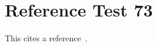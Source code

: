 \documentclass{article}
\begin{document}
\section{Reference Test 73}
This cites a reference~\cite{test73}.

\end{document}
